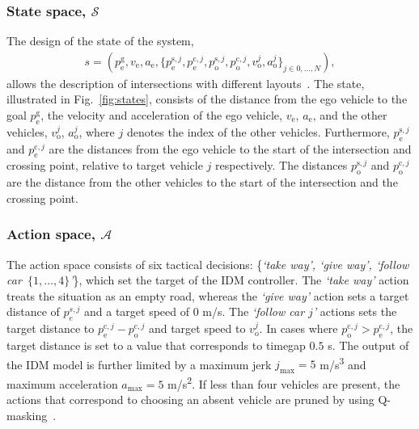 \subsubsection{State space, $\mathcal{S}$}
The design of the state of the system, 
%
\begin{align}
	s = (p^\mathrm{g}_\mathrm{e}, v_\mathrm{e}, a_\mathrm{e}, \{p^{\mathrm{s},j}_\mathrm{e}, p^{\mathrm{c},j}_\mathrm{e}, p^{\mathrm{s},j}_\mathrm{o}, p^{\mathrm{c},j}_\mathrm{o}, v^j_\mathrm{o}, a^j_\mathrm{o}\}_{j\in0,\dots,N}),
\end{align}
%
allows the description of intersections with different layouts~\cite{Tram2018}. The state, illustrated in Fig.~\ref{fig:states}, consists of the distance from the ego vehicle to the goal $p^\mathrm{g}_\mathrm{e}$, the velocity and acceleration of the ego vehicle, $v_\mathrm{e}$, $a_\mathrm{e}$, and the other vehicles, $v^j_\mathrm{o}$, $a_\mathrm{o}^j$, where $j$ denotes the index of the other vehicles. Furthermore, $p^{\mathrm{s},j}_\mathrm{e}$ and $p^{\mathrm{c},j}_\mathrm{e}$ are the distances from the ego vehicle to the start of the intersection and crossing point, relative to target vehicle $j$ respectively. The distances $p^{\mathrm{s},j}_\mathrm{o}$ and $p^{\mathrm{c},j}_\mathrm{o}$ are the distance from the other vehicles to the start of the intersection and the crossing point. 

\subsubsection{Action space, $\mathcal{A}$}
The action space consists of six tactical decisions: \{\textit{`take way', `give way', `follow car~$\{1, \dots , 4\}$'}\}, which set the target of the IDM controller. The \textit{`take way'} action treats the situation as an empty road, whereas the \textit{`give way'} action sets a target distance of $p^{s,j}_{e}$ and a target speed of $0$ m/s. The \textit{`follow car $j$'} actions sets the target distance to $p^{\mathrm{c},j}_\mathrm{e} - p^{\mathrm{c},j}_\mathrm{o}$ and target speed to $v^j_\mathrm{o}$. In cases where $p^{\mathrm{c},j}_\mathrm{o} > p^{\mathrm{c},j}_\mathrm{e}$, the target distance is set to a value that corresponds to timegap $0.5$ s.
The output of the IDM model is further limited by a maximum jerk $j_{\max}=5$ m/s\textsuperscript{3} and maximum acceleration $a_{\max}=5$ m/s\textsuperscript{2}. If less than four vehicles are present, the actions that correspond to choosing an absent vehicle are pruned by using Q-masking~\cite{Mukadam2017}.


